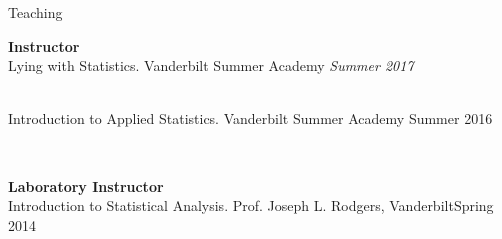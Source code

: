\begin{rSection}{\textrm{Teaching}}
\vspace*{2pt}
\begin{minipage}{\linewidth}{\large {\bf Instructor}\\}
Lying with Statistics. Vanderbilt Summer Academy \hfill{\textit{ Summer 2017}}%
\begin{comment}
\begin{quote}\small ....
\end{quote}
\end{comment}
\smallskip\\
Introduction to Applied Statistics. Vanderbilt Summer Academy \hfill{Summer 2016}%
\begin{comment}\begin{quote}\small Course Description: Media stories about ``the latest scientific findings'' can range from the plausible to the silly. This class will help you learn to separate truth from  fiction by introducing you to the basic statistical methods and tools used in psychological  research. You will learn to use \R, a free and powerful statistical software package, to conduct and interpret basic scientific statistical tests. You will begin to recognize the difference between proper and improper use of data, especially the distinction between correlation and causation (\textit{e.g.}, why margarine consumption does not actually lead to more divorces in the state of Maine). For the final project, you will formulate and answer your own scientific question using these new tools and real psychology data.
\end{quote}\end{comment}
\end{minipage}
\smallskip\\
\begin{minipage}{\linewidth}{\large {\bf Laboratory Instructor}\\}
Introduction to Statistical Analysis. Prof. Joseph L. Rodgers, Vanderbilt\hfill  {Spring 2014}%

\end{minipage}
\end{rSection}

